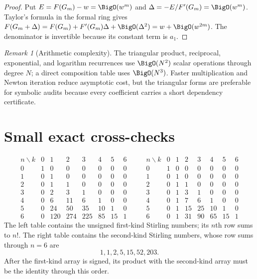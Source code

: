 \documentclass[11pt,a4paper,oneside,openany]{book}
\theoremstyle{definition}
\theoremstyle{remark}
\newtheorem{remark}[theorem]{Remark}
\begin{document}
\begin{proof}
Put $E=F(G_m)-w=\BigO(w^m)$ and $\Delta=-E/F'(G_m)=\BigO(w^m)$.  Taylor's formula
in the formal ring gives
$F(G_m+\Delta)=F(G_m)+F'(G_m)\Delta+\BigO(\Delta^2)=w+\BigO(w^{2m})$.
The denominator is invertible because its constant term is $a_1$.
\end{proof}

\begin{remark}[Arithmetic complexity]
The triangular product, reciprocal, exponential, and logarithm recurrences use
$\BigO(N^2)$ scalar operations through degree $N$; a direct composition table uses
$\BigO(N^3)$.  Faster multiplication and Newton iteration reduce asymptotic cost,
but the triangular forms are preferable for symbolic audits because every
coefficient carries a short dependency certificate.
\end{remark}

\section{Small exact cross-checks}

\[
\begin{array}{c|rrrrrrr}
 n\backslash k&0&1&2&3&4&5&6\\ \hline
0&1&0&0&0&0&0&0\\1&0&1&0&0&0&0&0\\2&0&1&1&0&0&0&0\\
3&0&2&3&1&0&0&0\\4&0&6&11&6&1&0&0\\5&0&24&50&35&10&1&0\\
6&0&120&274&225&85&15&1
\end{array}
\qquad
\begin{array}{c|rrrrrrr}
 n\backslash k&0&1&2&3&4&5&6\\ \hline
0&1&0&0&0&0&0&0\\1&0&1&0&0&0&0&0\\2&0&1&1&0&0&0&0\\
3&0&1&3&1&0&0&0\\4&0&1&7&6&1&0&0\\5&0&1&15&25&10&1&0\\
6&0&1&31&90&65&15&1
\end{array}                                                               \tag{\(*\)}
\]
The left table contains the unsigned first-kind Stirling numbers; its
$n$th row sums to $n!$.  The right table contains the second-kind Stirling
numbers, whose row sums through $n=6$ are
\[
 1,1,2,5,15,52,203.
\]
After the first-kind array is signed, its product with the second-kind array
must be the identity through this order.
\end{document}
